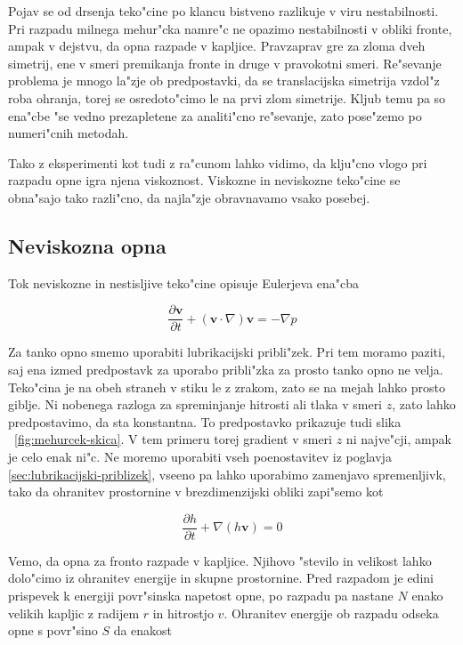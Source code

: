 \documentclass[a4paper,12pt]{article}
\renewcommand{\vec}{\mathbf}
\newcommand{\odv}[1]{\frac{\partial #1}{\partial t}}
\begin{document}
Pojav se od drsenja teko"cine po klancu bistveno razlikuje v viru nestabilnosti. Pri razpadu milnega mehur"cka namre"c ne opazimo nestabilnosti v obliki fronte, ampak v dejstvu, da opna razpade v kapljice. Pravzaprav gre za zloma dveh simetrij, ene v smeri premikanja fronte in druge v pravokotni smeri. Re"sevanje problema je mnogo la"zje ob predpostavki, da se translacijska simetrija vzdol"z roba ohranja, torej se osredoto"cimo le na prvi zlom simetrije. Kljub temu pa so ena"cbe "se vedno prezapletene za analiti"cno re"sevanje, zato pose"zemo po numeri"cnih metodah. 

Tako z eksperimenti kot tudi z ra"cunom lahko vidimo, da klju"cno vlogo pri razpadu opne igra njena viskoznost. Viskozne in neviskozne teko"cine se obna"sajo tako razli"cno, da najla"zje obravnavamo vsako posebej. 

\subsection{Neviskozna opna}
Tok neviskozne in nestisljive teko"cine opisuje Eulerjeva ena"cba

\begin{equation}
\label{eq:meh-euler}
 \odv{\vec v} + (\vec v \cdot \nabla)\vec v = - \nabla p
\end{equation}

Za tanko opno smemo uporabiti lubrikacijski pribli"zek. Pri tem moramo paziti, saj ena izmed predpostavk za uporabo pribli"zka za prosto tanko opno ne velja. Teko"cina je na obeh straneh v stiku le z zrakom, zato se na mejah lahko prosto giblje. Ni nobenega razloga za spreminjanje hitrosti ali tlaka v smeri $z$, zato lahko predpostavimo, da sta konstantna. To predpostavko prikazuje tudi slika ~\ref{fig:mehurcek-skica}. V tem primeru torej gradient v smeri $z$ ni najve"cji, ampak je celo enak ni"c. Ne moremo uporabiti vseh poenostavitev iz poglavja \ref{sec:lubrikacijski-priblizek}, vseeno pa lahko uporabimo zamenjavo spremenljivk, tako da ohranitev prostornine v brezdimenzijski obliki zapi"semo kot

\begin{equation}
\label{eq:meh-ohranitev}
 \odv{h} + \nabla (h\vec v) = 0
\end{equation}

Vemo, da opna za fronto razpade v kapljice. Njihovo "stevilo in velikost lahko dolo"cimo iz ohranitev energije in skupne prostornine. Pred razpadom je edini prispevek k energiji povr"sinska napetost opne, po razpadu pa nastane $N$ enako velikih kapljic z radijem $r$ in hitrostjo $v$. Ohranitev energije ob razpadu odseka opne s povr"sino $S$ da enakost
\end{document}
